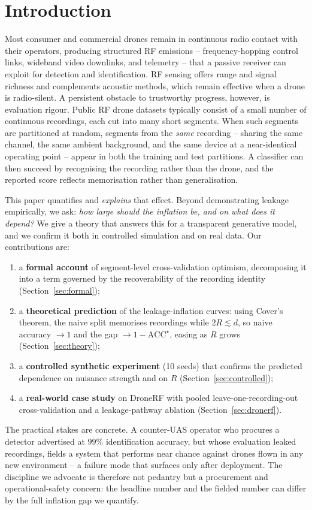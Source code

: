 \documentclass[11pt]{article}
\begin{document}
\section{Introduction}
Most consumer and commercial drones remain in continuous radio contact with their operators, producing structured RF emissions -- frequency-hopping control links, wideband video downlinks, and telemetry -- that a passive receiver can exploit for detection and identification. RF sensing offers range and signal richness and complements acoustic methods, which remain effective when a drone is radio-silent. A persistent obstacle to trustworthy progress, however, is evaluation rigour. Public RF drone datasets typically consist of a small number of continuous recordings, each cut into many short segments. When such segments are partitioned at random, segments from the \emph{same} recording -- sharing the same channel, the same ambient background, and the same device at a near-identical operating point -- appear in both the training and test partitions. A classifier can then succeed by recognising the recording rather than the drone, and the reported score reflects memorisation rather than generalisation.

This paper quantifies and \emph{explains} that effect. Beyond demonstrating leakage empirically, we ask: \emph{how large should the inflation be, and on what does it depend?} We give a theory that answers this for a transparent generative model, and we confirm it both in controlled simulation and on real data. Our contributions are:
\begin{enumerate}
\item a \textbf{formal account} of segment-level cross-validation optimism, decomposing it into a term governed by the recoverability of the recording identity (Section~\ref{sec:formal});
\item a \textbf{theoretical prediction} of the leakage-inflation curves: using Cover's theorem, the naive split memorises recordings while $2R \lesssim d$, so naive accuracy $\to 1$ and the gap $\to 1-\mathrm{ACC}^\star$, easing as $R$ grows (Section~\ref{sec:theory});
\item a \textbf{controlled synthetic experiment} (10 seeds) that confirms the predicted dependence on nuisance strength and on $R$ (Section~\ref{sec:controlled});
\item a \textbf{real-world case study} on DroneRF with pooled leave-one-recording-out cross-validation and a leakage-pathway ablation (Section~\ref{sec:dronerf}).
\end{enumerate}
The practical stakes are concrete. A counter-UAS operator who procures a detector advertised at $99\%$ identification accuracy, but whose evaluation leaked recordings, fields a system that performs near chance against drones flown in any new environment -- a failure mode that surfaces only after deployment. The discipline we advocate is therefore not pedantry but a procurement and operational-safety concern: the headline number and the fielded number can differ by the full inflation gap we quantify.
\end{document}
